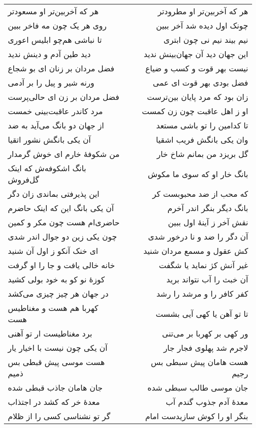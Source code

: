 \begin{center}
\begin{longtable}{l p{0.5cm} r}
هر که آخربین‌تر او مسعودتر
&&
هر که آخربین‌تر او مطرودتر
\\
روی هر یک چون مه فاخر ببین
&&
چونک اول دیده شد آخر ببین
\\
تا نباشی هم‌چو ابلیس اعوری
&&
نیم بیند نیم نی چون ابتری
\\
دید طین آدم و دینش ندید
&&
این جهان دید آن جهان‌بینش ندید
\\
فضل مردان بر زنان ای بو شجاع
&&
نیست بهر قوت و کسب و ضیاع
\\
ورنه شیر و پیل را بر آدمی
&&
فضل بودی بهر قوت ای عمی
\\
فضل مردان بر زن ای حالی‌پرست
&&
زان بود که مرد پایان بین‌ترست
\\
مرد کاندر عاقبت‌بینی خمست
&&
او ز اهل عاقبت چون زن کمست
\\
از جهان دو بانگ می‌آید به ضد
&&
تا کدامین را تو باشی مستعد
\\
آن یکی بانگش نشور اتقیا
&&
وان یکی بانگش فریب اشقیا
\\
من شکوفهٔ خارم ای خوش گرمدار
&&
گل بریزد من بمانم شاخ خار
\\
بانگ اشکوفه‌ش که اینک گل‌فروش
&&
بانگ خار او که سوی ما مکوش
\\
این پذیرفتی بماندی زان دگر
&&
که محب از ضد محبوبست کر
\\
آن یکی بانگ این که اینک حاضرم
&&
بانگ دیگر بنگر اندر آخرم
\\
حاضری‌ام هست چون مکر و کمین
&&
نقش آخر ز آینهٔ اول ببین
\\
چون یکی زین دو جوال اندر شدی
&&
آن دگر را ضد و نا درخور شدی
\\
ای خنک آنکو ز اول آن شنید
&&
کش عقول و مسمع مردان شنید
\\
خانه خالی یافت و جا را او گرفت
&&
غیر آنش کژ نماید یا شگفت
\\
کوزهٔ نو کو به خود بولی کشید
&&
آن خبث را آب نتواند برید
\\
در جهان هر چیز چیزی می‌کشد
&&
کفر کافر را و مرشد را رشد
\\
کهربا هم هست و مغناطیس هست
&&
تا تو آهن یا کهی آیی بشست
\\
برد مغناطیست ار تو آهنی
&&
ور کهی بر کهربا بر می‌تنی
\\
آن یکی چون نیست با اخیار یار
&&
لاجرم شد پهلوی فجار جار
\\
هست موسی پیش قبطی بس ذمیم
&&
هست هامان پیش سبطی بس رجیم
\\
جان هامان جاذب قبطی شده
&&
جان موسی طالب سبطی شده
\\
معدهٔ خر که کشد در اجتذاب
&&
معدهٔ آدم جذوب گندم آب
\\
گر تو نشناسی کسی را از ظلام
&&
بنگر او را کوش سازیدست امام
\\
\end{longtable}
\end{center}
